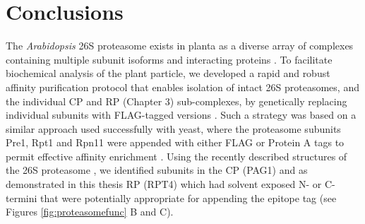 \section{Conclusions}

The \textit{Arabidopsis} 26S proteasome exists in planta as a diverse array of complexes containing multiple subunit isoforms and interacting proteins \citep{book10, fu99, yang04}.  To facilitate biochemical analysis of the plant particle, we developed a rapid and robust affinity purification protocol that enables isolation of intact 26S proteasomes, and the individual CP and RP (Chapter 3) sub-complexes, by genetically replacing individual subunits with FLAG-tagged versions \citep{book10}.  Such a strategy was based on a similar approach used successfully with yeast, where the proteasome subunits Pre1, Rpt1 and Rpn11 were appended with either FLAG or Protein A tags to permit effective affinity enrichment \citep{leggett05}.  Using the recently described structures of the 26S proteasome \citep{bhattacharyya14, lander12, lasker12}, we identified subunits in the CP (PAG1) and as demonstrated in this thesis RP (RPT4) which had solvent exposed N- or C-termini that were potentially appropriate for appending the epitope tag (see Figures \ref{fig:proteasomefunc} B and C).  


\begin{singlespace}

\renewcommand\bibname{Literature Cited}

\end{singlespace}


